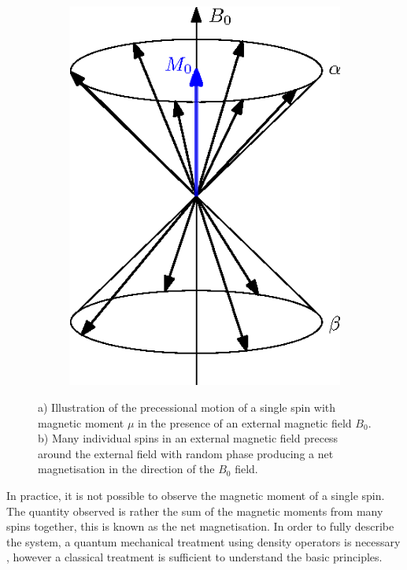 \begin{figure}
\begin{subfigure}{0.3\textwidth}
		\includegraphics[width = \textwidth]{figures/background/manyspins.eps}
		\caption{}
		\label{fig:manyspins}
	\end{subfigure}
	
	\caption{a) Illustration of the precessional motion of a single spin with magnetic moment $\mu$ in the presence of an external magnetic field $B_0$. b) Many individual spins in an external magnetic field precess around the external field with random phase producing a net magnetisation in the direction of the $B_0$ field.}
	\label{fig:precession-spins}
	
\end{figure}


In practice, it is not possible to observe the magnetic moment of a single spin. 
The quantity observed is rather the sum of the magnetic moments from many spins together, this is known as the net magnetisation. 
In order to fully describe the system, a quantum mechanical treatment using density operators is necessary \cite{Levitt2008}, however a classical treatment is sufficient to understand the basic principles. 

